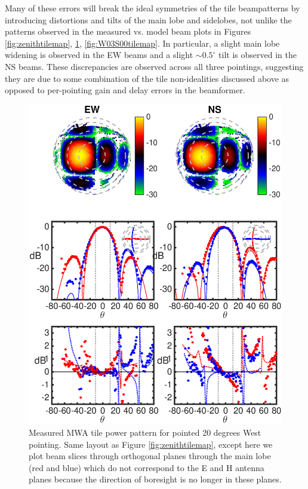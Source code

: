 Many of these errors will break the ideal symmetries of the tile beampatterns by introducing distortions and tilts of the main lobe and sidelobes, not unlike the patterns observed in the measured vs. model beam plots in Figures \ref{fig:zenithtilemap}, \ref{fig:E03S00tilemap}, \ref{fig:W03S00tilemap}. In particular, a slight main lobe widening is observed in the EW beams and a slight $\sim0.5^\circ$ tilt is observed in the NS beams. These discrepancies are observed across all three pointings, suggesting they are due to some combination of the tile non-idealities discussed above as opposed to per-pointing gain and delay errors in the beamformer.

\begin{figure}
\includegraphics[width=5in]{chap1_precision_beammapping_figures/E03S00_abs.eps}
\caption[The measured MWA tile beampattern for the 20 degree West pointing.]{Measured MWA tile power pattern for pointed 20 degrees West pointing. Same layout as Figure \ref{fig:zenithtilemap}, except here we plot beam slices through orthogonal planes through the main lobe (red and blue) which do not correspond to the E and H antenna planes because the direction of boresight is no longer in these planes.}
\label{fig:E03S00tilemap}
\end{figure}

